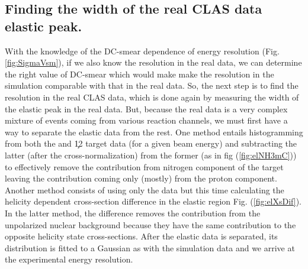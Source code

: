 \subsection{Finding the width of the real CLAS data elastic peak.}
With the knowledge of the DC-smear dependence of energy resolution (Fig. \ref{fig:SigmaVsm}), if we also know the resolution in the real data, 
we can determine the right value of DC-smear which would make make the resolution in the simulation comparable with that in the real data. So, 
the next step is to find the resolution in the real CLAS data, which is done again by measuring the width of the elastic peak in the real data. 
But, because the real data is a very complex mixture of events coming from various reaction channels, we must first have a way to separate the elastic 
data from the rest. One method entails histogramming \dE from both the  and \c12 target data (for a given beam energy) and subtracting 
the latter (after the cross-normalization) from the former (as in fig (\ref{fig:elNH3mC})) to effectively remove the contribution from nitrogen 
component of the  target leaving the contribution coming only (mostly) 
from the proton component. Another method consists of using only the  data but this time calculating the helicity dependent cross-section 
difference in the elastic region Fig. (\ref{fig:elXsDif}). In the latter method, the difference removes the contribution from the unpolarized 
nuclear background because they have the same contribution to the opposite helicity state cross-sections. After the elastic data is separated, its 
\dE distribution is fitted to a Gaussian as with the simulation data and we arrive at the experimental energy resolution. 



